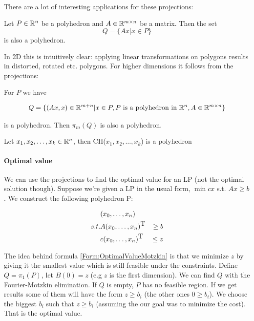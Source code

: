 There are a lot of interesting applications for these projections:

\begin{thm}\label{Thm:linTransPoly} Let $P\in \mathbb{R}^n$ be a polyhedron and $A\in \mathbb{R}^{m\times n}$ be a matrix. Then the set
\[Q=\{Ax|x\in P\}\]
is also a polyhedron.
\end{thm}

In 2D this is intuitively clear: applying linear transformations on polygons results in distorted, rotated etc. polygons. For higher dimensions it follows from the projections:

\begin{pr} For $P$ we have

\[Q=\{(Ax,x)\in \mathbb{R}^{m+n}| x\in P, P\text{ is a polyhedron in } \mathbb{R}^{n}, A \in \mathbb{R}^{m \times n}\}\]  %

is a polyhedron. Then $\pi_m(Q)$ is also a polyhedron.
\end{pr}

\begin{cor} Let $x_1,x_2,\ldots, x_k \in \mathbb{R}^n$, then CH($x_1,x_2,\ldots, x_k$) is a polyhedron\end{cor}

\paragraph*{Optimal value} We can use the projections to find the optimal value for an LP (not the optimal solution though). Suppose we're given a LP in the usual form, $\min cx$ s.t. $Ax\geq b$. We construct the following polyhedron P:

\begin{align}  \notag
 & (x_0,\ldots,x_n) & \\ \notag
s.t. & A(x_0,\ldots,x_n)^{\mbox{T}} & \geq b \\
& c(x_0,\ldots,x_n)^{\mbox{T}} & \leq z \label{Form:OptimalValueMotzkin}
\end{align}

The idea behind formula \ref{Form:OptimalValueMotzkin} is that we minimize $z$ by giving it the smallest value which is still feasible under the constraints.
Define $Q = \pi_1(P)$, let $B(0)=z$ (e.g $z$ is the first dimension). We can find $Q$ with the Fourier-Motzkin elimination. If $Q$ is empty, $P$ has no feasible region. If we get results some of them will have the form $z \geq b_i$ (the other ones $0 \geq b_i$). We choose the biggest $b_i$ such that $z \geq b_i$ (assuming the our goal was to minimize the cost). That is the optimal value. 

